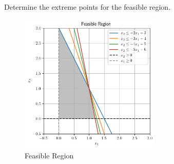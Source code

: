 Determine the extreme points for the feasible region.

\begin{solution}
  \begin{figure}[h]
    \centering
    \includegraphics[width=0.6\textwidth]{problem_6i.png}
    \caption{Feasible Region}
    \label{fig:problem_6i}
  \end{figure}
  \ \\
\end{solution}